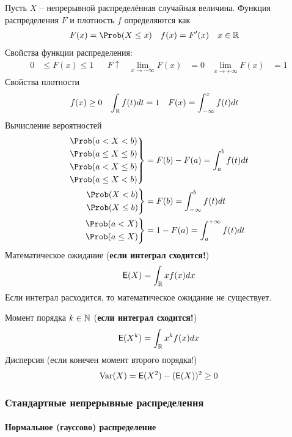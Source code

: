 Пусть \(X\) -- непрерывной распределённая случайная величина. Функция распределения \(F\) и плотность \(f\)
определяются как
\begin{align*}
	F(x)&=\Prob(X\leq x) & f(x)&=F'(x) & x&\in\R
\end{align*}
Свойства функции распределения:
\begin{align*}
	0&\leq F(x)\leq1 & &F \uparrow & 
	\lim_{x\to-\infty}F(x)&=0 & \lim_{x\to+\infty}F(x)&=1
\end{align*}
Свойства плотности
\begin{align*}
	f(x)&\geq 0 & \int_{\mathbb R} f(t)dt&=1 & F(x)&=\int_{-\infty}^x f(t)dt
\end{align*}
Вычисление вероятностей
\begin{align*}
	\left.\begin{aligned}
	&\Prob(a<X<b) \\ & \Prob(a\leq X\leq b) \\ 
	& \Prob(a<X\leq b) \\ &\Prob(a\leq X< b)
	\end{aligned}
	\right\}&=F(b)-F(a)=\int_a^b f(t)dt\\
	\left.\begin{aligned}
	&\Prob(X<b) \\ & \Prob(X\leq b)
	\end{aligned}
	\right\}&=F(b)=\int_{-\infty}^b f(t)dt\\
	\left.\begin{aligned}
	&\Prob(a<X) \\ & \Prob(a\leq X)
	\end{aligned}
	\right\}&=1-F(a)=\int_{a}^{+\infty} f(t)dt
\end{align*}
Математическое ожидание (\textbf{если интеграл сходится!})
\[
	{\mathsf E}(X)=\int_{\mathbb R} xf(x)dx
\]
Если интеграл расходится, то математическое ожидание не существует.

Момент порядка \(k\in\mathbb N\)  (\textbf{если интеграл сходится!})
\[
	{\mathsf E}(X^k)=\int_{\mathbb R} x^kf(x)dx
\]
Дисперсия (если конечен момент второго порядка!)
\[
	\operatorname{Var}(X)={\mathsf E}(X^2)-({\mathsf E}(X))^2\geq0
\]

\subsubsection{Стандартные непрерывные распределения}

\paragraph{Нормальное (гауссово) распределение}

